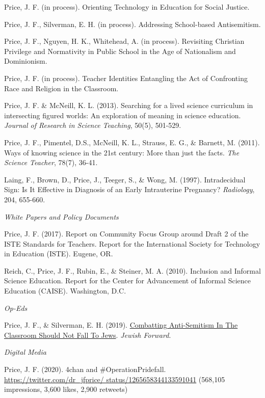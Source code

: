 \documentclass[11pt,article,oneside]{memoir}
\begin{document}
\ind Price, J. F. (in process). Orienting Technology in Education for Social Justice.

\ind Price, J. F., Silverman, E. H. (in process). Addressing School-based Antisemitism.

\ind Price, J. F., Nguyen, H. K., Whitehead, A. (in process). Revisiting Christian Privilege and Normativity in Public School in the Age of Nationalism and Dominionism.

\ind Price, J. F. (in process). Teacher Identities Entangling the Act of Confronting Race and Religion in the Classroom.

\ind Price, J. F. \& McNeill, K. L. (2013). Searching for a lived science curriculum in intersecting figured worlds: An exploration of meaning in science education. \textit{Journal of Research in Science Teaching}, 50(5), 501-529.

\ind Price, J. F., Pimentel, D.S., McNeill, K. L., Strauss, E. G., \& Barnett, M. (2011). Ways of knowing science in the 21st century: More than just the facts. \textit{The Science Teacher}, 78(7), 36-41.

\ind Laing, F., Brown, D., Price, J., Teeger, S., \& Wong, M. (1997). Intradecidual Sign: Is It Effective in Diagnosis of an Early Intrauterine Pregnancy? \textit{Radiology}, 204, 655-660.

\bigskip
\noindent\emph{White Papers and Policy Documents \vspace{0.05in}}

\ind Price, J. F. (2017). Report on Community Focus Group around Draft 2 of the ISTE Standards for Teachers. Report for the International Society for Technology in Education (ISTE). Eugene, OR.

\ind Reich, C., Price, J. F., Rubin, E., \& Steiner, M. A. (2010). Inclusion and Informal Science Education. Report for the Center for Advancement of Informal Science Education (CAISE). Washington, D.C.

\bigskip
\noindent\emph{Op-Eds \vspace{0.05in}}

\ind Price, J. F., \& Silverman, E. H. (2019). \href{https://forward.com/opinion/426018/combatting-anti-semitism-in-the-classroom-should-not-fall-to-jews/}{Combatting Anti-Semitism In The Classroom Should Not Fall To Jews}. \textit{Jewish Forward}.

\bigskip
\noindent\emph{Digital Media \vspace{0.05in}}

\ind Price, J. F. (2020). 4chan and \#OperationPridefall. \href{https://twitter.com/dr\_jfprice/status/1265658344133591041}{https://twitter.com/dr\_jfprice/ \newline status/1265658344133591041} (568,105 impressions, 3,600 likes, 2,900 retweets)
\end{document}
